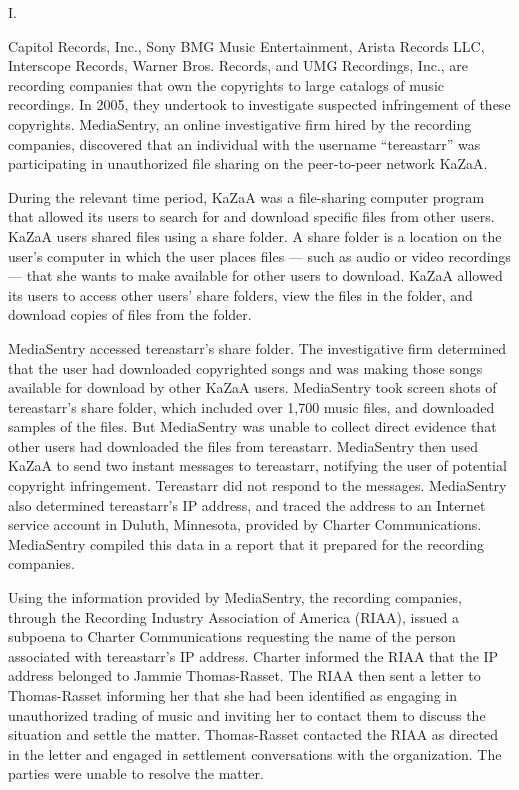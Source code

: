 {\centering
I.
\par}

Capitol Records, Inc., Sony BMG Music Entertainment, Arista Records LLC,
Interscope Records, Warner Bros. Records, and UMG Recordings, Inc., are
recording companies that own the copyrights to large catalogs of music
recordings. In 2005, they undertook to investigate suspected infringement of
these copyrights. MediaSentry, an online investigative firm hired by the
recording companies, discovered that an individual with the username
``tereastarr'' was participating in unauthorized file sharing on the
peer-to-peer network KaZaA.

During the relevant time period, KaZaA was a file-sharing computer program that
allowed its users to search for and download specific files from other users.
KaZaA users shared files using a share folder. A share folder is a location on
the user's computer in which the user places files --- such as audio or video
recordings --- that she wants to make available for other users to download.
KaZaA allowed its users to access other users' share folders, view the files in
the folder, and download copies of files from the folder.

MediaSentry accessed tereastarr's share folder. The investigative firm
determined that the user had downloaded copyrighted songs and was making those
songs available for download by other KaZaA users. MediaSentry took screen
shots of tereastarr's share folder, which included over 1,700 music files, and
downloaded samples of the files. But MediaSentry was unable to collect direct
evidence that other users had downloaded the files from tereastarr. MediaSentry
then used KaZaA to send two instant messages to tereastarr, notifying the user
of potential copyright infringement. Tereastarr did not respond to the
messages. MediaSentry also determined tereastarr's IP address, and traced the
address to an Internet service account in Duluth, Minnesota, provided by
Charter Communications. MediaSentry compiled this data in a report that it
prepared for the recording companies.

Using the information provided by MediaSentry, the recording companies, through
the Recording Industry Association of America (RIAA), issued a subpoena to
Charter Communications requesting the name of the person associated with
tereastarr's IP address. Charter informed the RIAA that the IP address belonged
to Jammie Thomas-Rasset. The RIAA then sent a letter to Thomas-Rasset informing
her that she had been identified as engaging in unauthorized trading of music
and inviting her to contact them to discuss the situation and settle the
matter. Thomas-Rasset contacted the RIAA as directed in the letter and engaged
in settlement conversations with the organization. The parties were unable to
resolve the matter.

